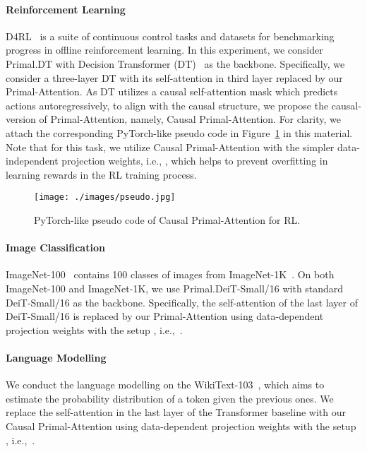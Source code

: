 \documentclass{article}
\begin{document}
\paragraph{Reinforcement Learning}
D4RL~\cite{fu2020d4rl} is a suite of continuous control tasks and datasets for benchmarking progress in offline reinforcement learning.
In this experiment, we consider Primal.DT with Decision Transformer (DT)~\cite{chen2021decision} as the backbone.
Specifically, we consider a three-layer DT with its self-attention in third layer replaced by our Primal-Attention.
As DT utilizes a causal self-attention mask which predicts actions autoregressively, to align with the causal structure, we propose the causal-version of Primal-Attention, namely, Causal Primal-Attention. 
For clarity, we attach the corresponding PyTorch-like pseudo code in Figure~\ref{listing::causal} in this material.
Note that for this task, we utilize Causal Primal-Attention with the simpler data-independent projection weights, i.e., , which helps to prevent overfitting in learning rewards in the RL training process.

\begin{figure}[t]
\centering    
{\texttt{[image: ./images/pseudo.jpg]}}
\caption{PyTorch-like pseudo code of Causal Primal-Attention for RL.
}
\label{listing::causal}
\end{figure}

\paragraph{Image Classification}
ImageNet-100~\cite{russakovsky2015imagenet} contains 100 classes of images
from ImageNet-1K~\cite{deng2009imagenet}.
On both ImageNet-100 and ImageNet-1K,
we use Primal.DeiT-Small/16 with standard DeiT-Small/16 as the backbone.
Specifically, the self-attention of the last layer of DeiT-Small/16 is replaced by our Primal-Attention using data-dependent projection weights with the setup , i.e.,~.

\paragraph{Language Modelling} We conduct the language modelling on the WikiText-103~\cite{merity2016pointer}, which aims to estimate the probability distribution of a token given the previous ones.
We replace the self-attention in the last layer of the Transformer baseline with our Causal Primal-Attention using data-dependent projection weights with the setup , i.e.,~.
\end{document}

